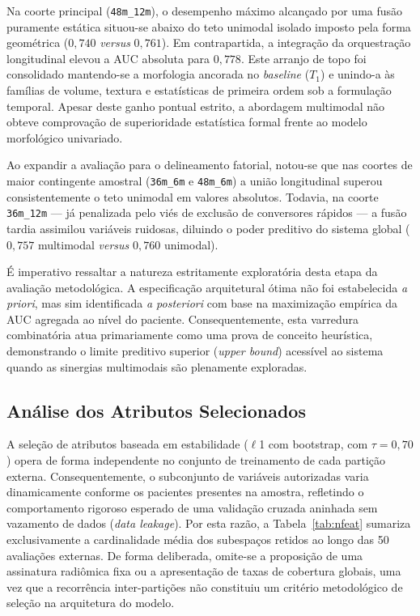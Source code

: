 \documentclass[review]{elsarticle}
\newcommand{\code}[1]{\texttt{#1}}
\begin{document}
	Na coorte principal (\code{48m\_12m}), o desempenho máximo alcançado por uma fusão puramente estática situou-se abaixo do teto unimodal isolado imposto pela forma geométrica ($0{,}740$ \emph{versus} $0{,}761$). Em contrapartida, a integração da orquestração longitudinal elevou a AUC absoluta para $0{,}778$. Este arranjo de topo foi consolidado mantendo-se a morfologia ancorada no \emph{baseline} ($T_1$) e unindo-a às famílias de volume, textura e estatísticas de primeira ordem sob a formulação temporal. Apesar deste ganho pontual estrito, a abordagem multimodal não obteve comprovação de superioridade estatística formal frente ao modelo morfológico univariado.
	
	Ao expandir a avaliação para o delineamento fatorial, notou-se que nas coortes de maior contingente amostral (\code{36m\_6m} e \code{48m\_6m}) a união longitudinal superou consistentemente o teto unimodal em valores absolutos. Todavia, na coorte \code{36m\_12m} --- já penalizada pelo viés de exclusão de conversores rápidos --- a fusão tardia assimilou variáveis ruidosas, diluindo o poder preditivo do sistema global ($0{,}757$ multimodal \emph{versus} $0{,}760$ unimodal).
	
	É imperativo ressaltar a natureza estritamente exploratória desta etapa da avaliação metodológica. A especificação arquitetural ótima não foi estabelecida \emph{a priori}, mas sim identificada \emph{a posteriori} com base na maximização empírica da AUC agregada ao nível do paciente. Consequentemente, esta varredura combinatória atua primariamente como uma prova de conceito heurística, demonstrando o limite preditivo superior (\emph{upper bound}) acessível ao sistema quando as sinergias multimodais são plenamente exploradas.
	
	\subsection{Análise dos Atributos Selecionados}\label{subsec:atributos-sel}
	
	A seleção de atributos baseada em estabilidade ($\ell$1 com bootstrap, com $\tau=0{,}70$) opera de forma independente no conjunto de treinamento de cada partição externa. Consequentemente, o subconjunto de variáveis autorizadas varia dinamicamente conforme os pacientes presentes na amostra, refletindo o comportamento rigoroso esperado de uma validação cruzada aninhada sem vazamento de dados (\emph{data leakage}). Por esta razão, a Tabela~\ref{tab:nfeat} sumariza exclusivamente a cardinalidade média dos subespaços retidos ao longo das 50 avaliações externas. De forma deliberada, omite-se a proposição de uma assinatura radiômica fixa ou a apresentação de taxas de cobertura globais, uma vez que a recorrência inter-partições não constituiu um critério metodológico de seleção na arquitetura do modelo.
	
\end{document}
